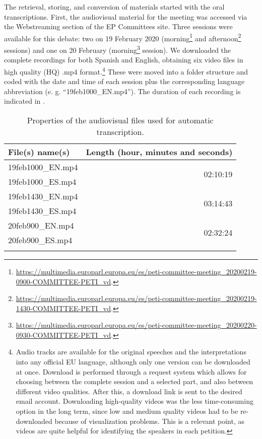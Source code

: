 \documentclass[output=paper]{langscibook}
\begin{document}
The retrieval, storing, and conversion of materials started with the oral transcriptions. First, the audiovisual material for the meeting was accessed via the Webstreaming section of the EP Committees site. Three sessions were available for this debate: two on 19 February 2020 (morning\footnote{\url{https://multimedia.europarl.europa.eu/es/peti-committee-meeting_20200219-0900-COMMITTEE-PETI_vd}.}  and afternoon\footnote{\url{https://multimedia.europarl.europa.eu/es/peti-committee-meeting_20200219-1430-COMMITTEE-PETI_vd}.}  sessions) and one on 20 February (morning\footnote{\url{https://multimedia.europarl.europa.eu/es/peti-committee-meeting_20200220-0930-COMMITTEE-PETI_vd}.}  session). We downloaded the complete recordings for both Spanish and English, obtaining six video files in high quality (HQ) .mp4 format.\footnote{Audio tracks are available for the original speeches and the interpretations into any official EU language, although only one version can be downloaded at once. Download is performed through a request system which allows for choosing between the complete session and a selected part, and also between different video qualities. After this, a download link is sent to the desired email account. Downloading high-quality videos was the less time-consuming option in the long term, since low and medium quality videos had to be re-downloaded because of visualization problems. This is a relevant point, as videos are quite helpful for identifying the speakers in each petition.} These were moved into a folder structure and coded with the date and time of each session plus the corresponding language abbreviation (e. g. “19feb1000\_EN.mp4”). The duration of each recording is indicated in .

\begin{table}
\begin{tabularx}{.8\textwidth}{Xr}

\lsptoprule

{\bfseries File(s) name(s)} & {\bfseries Length (hour, minutes and seconds)}\\
\midrule
19feb1000\_EN.mp4 & \multirow[t]{2}{*}{02:10:19}\\
19feb1000\_ES.mp4 & \\
\tablevspace
19feb1430\_EN.mp4 & \multirow[t]{2}{*}{03:14:43}\\
19feb1430\_ES.mp4 & \\
\tablevspace
20feb900\_EN.mp4 & \multirow[t]{2}{*}{02:32:24}\\
20feb900\_ES.mp4 & \\
\lspbottomrule
\end{tabularx}
\caption{
Properties of the audiovisual files used for automatic transcription.
}
\label{tab:corpas:1}
\end{table}
\end{document}
